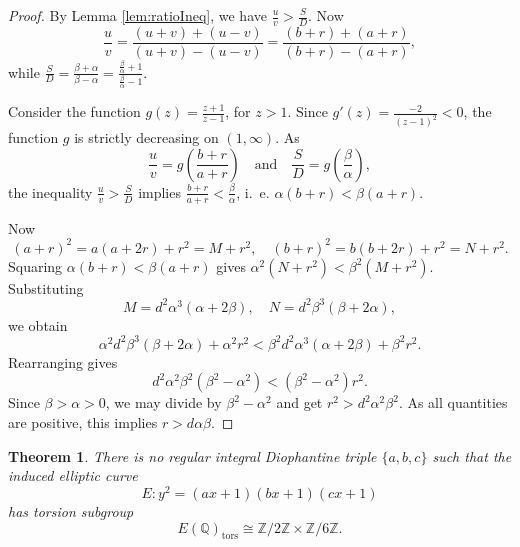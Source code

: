 \documentclass{article}
\theoremstyle{plain}
\newtheorem{theorem}{Theorem}
\newcommand{\Z}{\mathbb{Z}}
\newcommand{\Q}{\mathbb{Q}}
\newcommand{\tors}{\mathrm{tors}}
\begin{document}
\begin{proof}
By Lemma \ref{lem:ratioIneq}, we have \(\frac uv>\frac SD\). Now
\[
\frac{u}{v}
=\frac{(u+v)+(u-v)}{(u+v)-(u-v)}
=\frac{(b+r)+(a+r)}{(b+r)-(a+r)},
\]
while
\(\displaystyle
\frac{S}{D}
=\frac{\beta+\alpha}{\beta-\alpha}
=\frac{\frac{\beta}{\alpha}+1}{\frac{\beta}{\alpha}-1} \).

Consider the function \(g(z)=\frac{z+1}{z-1}\), for \(z>1\). Since
\(g'(z)=\frac{-2}{(z-1)^2}<0\), the function \(g\) is strictly decreasing on
\((1,\infty)\). As
\[
\frac uv=g\!\left(\frac{b+r}{a+r}\right)
\quad\text{and}\quad
\frac SD=g\!\left(\frac{\beta}{\alpha}\right),
\]
the inequality \(\frac uv>\frac SD\) implies
\(\frac{b+r}{a+r}<\frac{\beta}{\alpha}\), i.~e. \(\alpha(b+r)<\beta(a+r)\).

Now
\[
(a+r)^2=a(a+2r)+r^2=M+r^2,
\quad
(b+r)^2=b(b+2r)+r^2=N+r^2.
\]
Squaring \(\alpha(b+r)<\beta(a+r)\) gives
\(\alpha^2(N+r^2)<\beta^2(M+r^2)\). Substituting
\[
M=d^2\alpha^3(\alpha+2\beta),
\quad
N=d^2\beta^3(\beta+2\alpha),
\]
we obtain
\[
\alpha^2 d^2\beta^3(\beta+2\alpha)+\alpha^2r^2
<
\beta^2 d^2\alpha^3(\alpha+2\beta)+\beta^2r^2.
\]
Rearranging gives
\[
d^2\alpha^2\beta^2(\beta^2-\alpha^2)
<
(\beta^2-\alpha^2)r^2.
\]
Since \(\beta>\alpha>0\), we may divide by \(\beta^2-\alpha^2\) and get
\(r^2>d^2\alpha^2\beta^2\). As all quantities are positive, this implies
\(r>d\alpha\beta\).
\end{proof}

\begin{theorem}\label{thm:no-regular-2x6}
There is no regular integral Diophantine triple \(\{a,b,c\}\) such that the induced elliptic curve
\[
E:y^2=(ax+1)(bx+1)(cx+1)
\]
has torsion subgroup
\[
E(\Q)_{\tors}\cong \Z/2\Z\times \Z/6\Z.
\]
\end{theorem}
\end{document}

